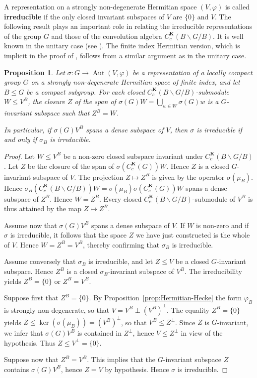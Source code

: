 \documentclass[12pt,a4paper]{amsproc}
\newtheorem{proposition}[theorem]{Proposition}
\theoremstyle{definition}
\DeclareMathOperator{\Aut}{Aut}
\newcommand{\KK}{\mathbf K}
\begin{document}
A representation on a strongly non-degenerate Hermitian space $(V, \varphi)$ is called \textbf{irreducible}  if the only closed invariant subspaces of $V$ are $\{0\}$ and $V$. 	
The following result plays an important role in relating the irreducible representations of the group $G$ and those of the convolution algebra $C_c^\KK(B\backslash G/B)$. It is well known in the unitary case (see \cite[Ch.~IV, Theorem 2]{Lang}). The finite index Hermitian version, which  is  implicit in  the proof of \cite[Proposition~5.4]{MoPy}, follows from a similar argument as in the unitary case.

\begin{proposition}\label{prop:Hecke-irred}
Let $\sigma \colon G \to \Aut(V, \varphi)$ be a representation of a locally compact group $G$ on a strongly non-degenerate Hermitian space of finite index, and let $B \leq G$ be a compact subgroup. For each closed  $ C_c^\KK(B\backslash G/B)$-submodule $W \leq V^B$, the closure $Z$ of the span of $\sigma(G)W= \bigcup_{w \in W} \sigma(G)w$ is a   $G$-invariant subspace such that $Z^B= W$. 

In particular, if  $\sigma(G)V^B $ spans a dense subspace of $V$, then  $\sigma$ is irreducible if and only if $\sigma_B$ is irreducible. 
\end{proposition}
\begin{proof}
Let $W  \leq V^B$ be a non-zero closed subspace invariant under $ C_c^\KK(B\backslash G/B)$. Let $Z$ be the closure of the span of $\sigma(C^\KK_c(G))W$. Hence $Z$ is a closed $G$-invariant subspace of $V$. The projection $Z\mapsto Z^B$ is given by the operator $ \sigma(\mu_B)$. Hence  $\sigma_B( C_c^\KK(B\backslash G/B)) W= \sigma(\mu_B) \sigma(C^\KK_c(G))W$ spans a dense subspace of $Z^B$. Hence $W = Z^B$. Every closed  $C_c^\KK(B\backslash G/B) $-submodule of $V^B$ is thus attained by the map $Z \mapsto Z^B$. 

Assume now that $\sigma(G)V^B$ spans a dense subspace of $V$. If $W$ is non-zero and if $\sigma$ is irreducible, it follows that the space $Z$ we have just constructed is the whole of $V$. Hence $W = Z^B = V^B$, thereby confirming that $\sigma_B$ is irreducible. 

Assume conversely that $\sigma_B$ is irreducible, and let $Z \leq V$ be a  closed $G$-invariant subspace. Hence $Z^B $ is a closed $\sigma_B$-invariant subspace of $V^B$. The irreducibility yields $Z^B = \{0\}$ or $Z^B = V^B$. 

Suppose first that $Z^B = \{0\}$. By Proposition~\ref{prop:Hermitian-Hecke} the form $\varphi_B$ is strongly non-degenerate, so that $V = V^B \perp (V^B)^\perp$. The equality $Z^B = \{0\}$ yields $Z \leq \ker(\sigma(\mu_B)) = (V^B)^\perp$, so that $V^B \leq Z^\perp$. Since $Z$ is $G$-invariant, we infer that $\sigma(G)V^B  $ is contained in $Z^\perp$, hence $V \leq Z^\perp$ in view of the hypothesis.  Thus $Z \leq V^\perp = \{0\}$. 

Suppose now that $Z^B = V^B$. 
 This implies that the $G$-invariant subspace $Z$ contains $\sigma(G)V^B$, hence $Z= V$ by hypothesis. Hence $\sigma$ is irreducible.
\end{proof}
		
\end{document}
